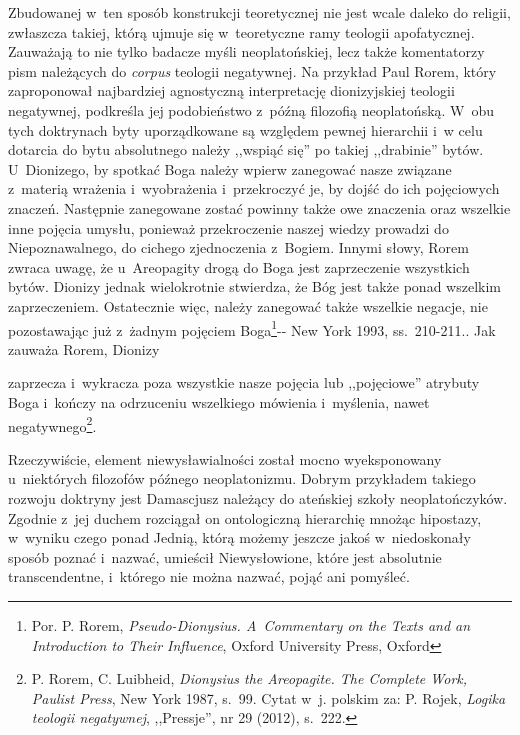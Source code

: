Zbudowanej w~ten sposób konstrukcji teoretycznej nie jest wcale daleko do religii, zwłaszcza takiej, którą ujmuje się w~teoretyczne ramy teologii apofatycznej. Zauważają to nie tylko badacze myśli neoplatońskiej, lecz także komentatorzy pism należących do \textit{corpus} teologii negatywnej. Na przykład Paul Rorem, który zaproponował najbardziej agnostyczną interpretację dionizyjskiej teologii negatywnej, podkreśla jej podobieństwo z~późną filozofią neoplatońską. W~obu tych doktrynach byty uporządkowane są względem pewnej hierarchii i~w celu dotarcia do bytu absolutnego należy ,,wspiąć się'' po takiej ,,drabinie'' bytów. U~Dionizego, by spotkać Boga należy wpierw zanegować nasze związane z~materią wrażenia i~wyobrażenia i~przekroczyć je, by dojść do ich pojęciowych znaczeń. Następnie zanegowane zostać powinny także owe znaczenia oraz wszelkie inne pojęcia umysłu, ponieważ przekroczenie naszej wiedzy prowadzi do Niepoznawalnego, do cichego zjednoczenia z~Bogiem. Innymi słowy, Rorem zwraca uwagę, że u~Areopagity drogą do Boga jest zaprzeczenie wszystkich bytów. Dionizy jednak wielokrotnie stwierdza, że Bóg jest także ponad wszelkim zaprzeczeniem. Ostatecznie więc, należy zanegować także wszelkie negacje, nie pozostawając już z~żadnym pojęciem Boga\footnote{ Por. P. Rorem, \textit{Pseudo-Dionysius. A~Commentary on the Texts and an Introduction to Their Influence}, Oxford University Press, Oxford }-{- New York 1993, ss.~210-211.}. Jak zauważa Rorem, Dionizy

zaprzecza i~wykracza poza wszystkie nasze pojęcia lub ,,pojęciowe'' atrybuty Boga i~kończy na odrzuceniu wszelkiego mówienia i~myślenia, nawet negatywnego\footnote{ P. Rorem, C. Luibheid, \textit{Dionysius the Areopagite. The Complete Work, Paulist Press}, New York 1987, s.~99. Cytat w~j. polskim za: P. Rojek, \textit{Logika teologii negatywnej}, ,,Pressje'', nr 29 (2012), s.~222.}.

Rzeczywiście, element niewysławialności został mocno wyeksponowany u~niektórych filozofów późnego neoplatonizmu. Dobrym przykładem takiego rozwoju doktryny jest Damascjusz należący do ateńskiej szkoły neoplatończyków. Zgodnie z~jej duchem rozciągał on ontologiczną hierarchię mnożąc hipostazy, w~wyniku czego ponad Jednią, którą możemy jeszcze jakoś w~niedoskonały sposób poznać i~nazwać, umieścił Niewysłowione, które jest absolutnie transcendentne, i~którego nie można nazwać, pojąć ani pomyśleć.

